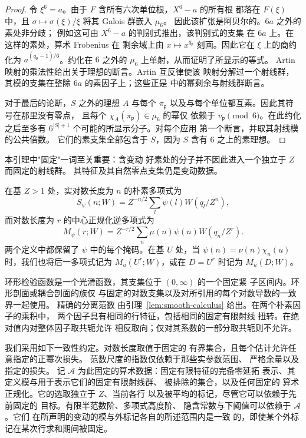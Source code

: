 \begin{proof}
令 $\xi^6=a$。由于 $F$ 含所有六次单位根，$X^6-a$ 的所有根
都落在 $F(\xi)$ 中，且
$\sigma\mapsto\sigma(\xi)/\xi$ 将其 Galois 群嵌入 $\mu_6$。
因此该扩张是阿贝尔的。$6a$ 之外的素处非分歧；
例如这可由 $X^6-a$ 的判别式推出，该判别式的支集
在 $6a$ 上。在这样的素处，算术 Frobenius 在
剩余域上由 $x\mapsto x^{q_{\mathfrak p}}$ 刻画。因此它在
$\xi$ 上的商约化为 $a^{(q_{\mathfrak p}-1)/6}$。约化在
$6$ 之外的 $\mu_6$ 上单射，从而证明了所显示的等式。
Artin 映射的乘法性给出关于理想的断言。Artin 互反律使该
映射分解过一个射线群，其模的支集在整除
$6a$ 的素因子上；这些正是
\cite[第 VIII 章，(5.3) 与 (5.5)]{MilneCFT} 中的幂剩余与射线群断言。

对于最后的论断，$S$ 之外的理想 $A$ 与每个
$\pi_{\mathfrak p}$ 以及与每个单位都互素。因此其符号在那里没有零点，
且每个 $\chi_A(\pi_{\mathfrak p})\in\mu_6$ 的幂仅
依赖于 $v_{\mathfrak p}\pmod6$。在此约化之后至多有
$6^{|S|+1}$ 个可能的所显示分子。对每个应用
第一个断言，并取其射线模的公共倍数。
它们的素支集全部包含于 $S$，因为 $S$ 含有
$6$ 之上的素理想。
\end{proof}

本引理中"固定"一词至关重要：含变动
好素处的分子并不因此进入一个独立于 $Z$ 而固定的射线群。
其特征及其自然零点支集仍是变动数据。

在基 $Z>1$ 处，实对数长度为 $n$ 的朴素多项式为
\begin{equation}
 S_\psi(n;W)=Z^{-n/2}\sum_l\psi(l)W(q_l/Z^n),
 \label{old-eq:1.1}
\end{equation}
而对数长度为 $r$ 的中心正规化逆多项式为
\begin{equation}
 M_\psi(r;W)=Z^{-r/2}\sum_n\mu(n)\psi(n)W(q_n/Z^r).
 \label{old-eq:1.1a}
\end{equation}
两个定义中都保留了 $\psi$ 中的每个掩码。在基 $U$ 处，当
$\psi(n)=\nu(n)\chi_n(u)$ 时，我们也将后一多项式记为
$M_u(U^r;W)$，或在 $D=U^r$ 时记为 $M_u(D;W)$。

环形检验函数是一个光滑函数，其支集位于 $(0,\infty)$ 的一个固定紧
子区间内。环形剖面或耦合剖面的族仅
与固定的对数支集以及对所引用的每个对数导数的一致界一起使用。
精确的分离范数
由引理~\ref{lem:smooth-calculus} 给出。在两个朴素因子的乘积中，
两个因子具有相同的行特征，包括相同的固定有限射线
扭转。在绝对值内对整体因子取共轭允许
相反取向；仅对其系数的一部分取共轭则不允许。

我们采用如下一致性约定。对数长度取值于固定的
有界集合，且每个估计允许任意指定的正幂次损失。
范数尺度的指数仅依赖于那些实参数范围、
严格余量以及指定的损失。
记 $\mathcal A$ 为此固定的算术数据：固定有限特征的完备零延拓
表示、其定义模与用于表示它们的固定有限射线群、
被排除的集合，以及任何固定的
算术正规化。它的选取独立于 $Z$、当前各行
以及被平均的标记，尽管它可以依赖于先前固定的
目标。有限半范数阶、多项式高度阶、
隐含常数与下阈值可以依赖于 $\mathcal A$。它们
在所声明的变动的模与外标记各自的所述范围内是一致
的，即使某个外标记在某次行求和期间被固定。

